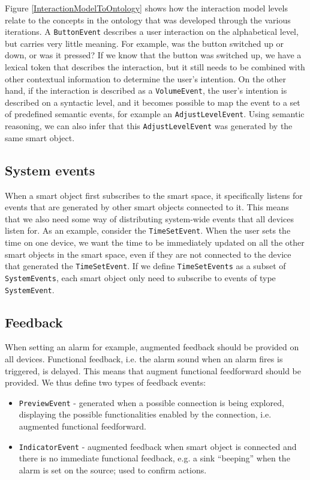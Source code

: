 Figure \ref{InteractionModelToOntology} shows how the interaction model levels relate to the concepts in the ontology that was developed through the various iterations. A \texttt{ButtonEvent} describes a user interaction on the alphabetical level, but carries very little meaning. For example, was the button switched up or down, or was it pressed? If we know that the button was switched up, we have a lexical token that describes the interaction, but it still needs to be combined with other contextual information to determine the user's intention. On the other hand, if the interaction is described as a \texttt{VolumeEvent}, the user's intention is described on a syntactic level, and it becomes possible to map the event to a set of predefined semantic events, for example an \texttt{AdjustLevelEvent}. Using semantic reasoning, we can also infer that this \texttt{AdjustLevelEvent} was generated by the same smart object.




\subsection{System events}
\label{SystemEvents}
When a smart object first subscribes to the smart space, it specifically listens for events that are generated by other smart objects connected to it. This means that we also need some way of distributing system-wide events that all devices listen for. As an example, consider the \texttt{TimeSetEvent}. When the user sets the time on one device, we want the time to be immediately updated on all the other smart objects in the smart space, even if they are not connected to the device that generated the \texttt{TimeSetEvent}. If we define \texttt{TimeSetEvents} as a subset of \texttt{SystemEvents}, each smart object only need to subscribe to events of type \texttt{SystemEvent}.


\subsection{Feedback}
When setting an alarm for example, augmented feedback should be provided on all devices. Functional feedback, i.e. the alarm sound when an alarm fires is triggered, is delayed. This means that augment functional feedforward should be provided. We thus define two types of feedback events:

\begin{itemize}
\item \texttt{PreviewEvent} - generated when a possible connection is being explored, displaying the possible functionalities enabled by the connection, i.e. augmented functional feedforward.
\item \texttt{IndicatorEvent} - augmented feedback when smart object is connected and there is no immediate functional feedback, e.g. a sink ``beeping'' when the alarm is set on the source; used to confirm actions.   
\end{itemize} 

